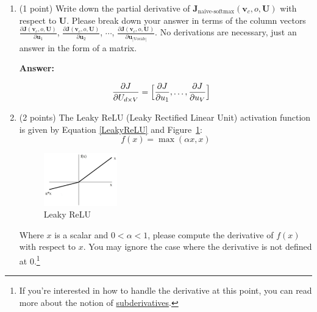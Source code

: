 \documentclass{article}
\newenvironment{answer}{
    {\bf Answer:} \sf \begingroup\color{black}
}{\endgroup}%
\begin{document}
\begin{enumerate}[label=(\alph*)]
\begin{shaded}
\begin{answer}
\end{answer}
\end{shaded}

\item (1 point) Write down the partial derivative of $\bm J_{\text{naive-softmax}}(\bm v_c, o, \bm U)$ with respect to $\bm U$. Please break down your answer in terms of the column vectors $\frac{\partial \bm J(\bm v_c, o, \bm U)}{\partial \bm u_1}$, $\frac{\partial \bm J(\bm v_c, o, \bm U)}{\partial \bm u_2}$, $\cdots$, $\frac{\partial \bm J(\bm v_c, o, \bm U)}{\partial \bm u_{|\text{Vocab}|}}$. No derivations are necessary, just an answer in the form of a matrix.

\begin{shaded}

\begin{answer}
\begin{equation}
    \begin{split}
    \frac{\partial J}{\partial U_{d \times V}}
    &= \Bigl[ \frac{\partial J}{\partial u_1}, \ldots, \frac{\partial J}{\partial u_V} \Bigl]
    \end{split}   
\end{equation}
\end{answer}
\end{shaded}

\item (2 points) The Leaky ReLU (Leaky Rectified Linear Unit) activation function is given by Equation \ref{LeakyReLU} and Figure~\ref{fig:leaky_relu}:
\begin{equation}
    \label{LeakyReLU}
    f(x) = \max(\alpha x, x)
\end{equation}

\begin{figure}[h]
    \centering
    \includegraphics[width=0.3\textwidth]{leaky_relu_graph.png}
    \caption{Leaky ReLU}
    \label{fig:leaky_relu}
\end{figure}

Where $x$ is a scalar and $0<\alpha <1$, please compute the derivative of $f(x)$ with respect to $x$. You may ignore the case where the derivative is not defined at 0.\footnote{If you're interested in how to handle the derivative at this point, you can read more about the notion of \hyperref[https://en.wikipedia.org/wiki/Subderivative]{subderivatives}.}


\end{enumerate}
\end{document}
